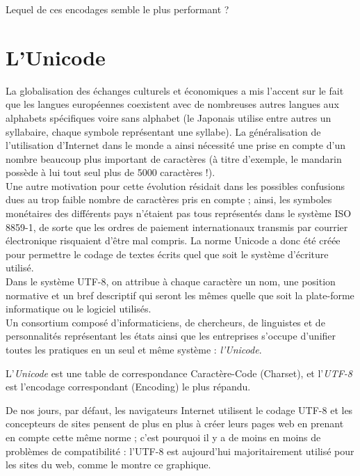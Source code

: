 \begin{exercice}[]
    Lequel de ces encodages semble le plus performant ?
\end{exercice}


\section{L'Unicode}

La globalisation des échanges culturels et économiques a mis l'accent sur le fait que les langues européennes coexistent avec de nombreuses
autres
langues aux alphabets spécifiques voire sans alphabet (le Japonais utilise entre autres un syllabaire, chaque symbole représentant une syllabe).
La
généralisation de l'utilisation d'Internet dans le monde a ainsi nécessité une prise en compte d'un
nombre beaucoup plus important de caractères (à titre d'exemple, le mandarin possède à lui tout seul plus de 5000 caractères !).\\
Une autre motivation pour cette
évolution résidait dans les possibles confusions dues au trop faible nombre de caractères pris en compte ; ainsi, les symboles monétaires des
différents
pays n'étaient pas tous représentés dans le système ISO 8859-1, de sorte que les ordres de paiement internationaux transmis par courrier
électronique
risquaient d'être mal compris. La norme Unicode a donc été créée pour permettre le codage de textes écrits quel que soit le système d'écriture
utilisé.\\

Dans le système UTF-8, on attribue à chaque caractère un nom, une position normative et un bref descriptif qui seront les mêmes quelle que soit
la plate-forme informatique
ou le logiciel utilisés.\\
Un consortium composé d'informaticiens, de chercheurs, de linguistes et de personnalités représentant les états ainsi que les entreprises
s'occupe d'unifier toutes les pratiques en un seul et même système : \textit{l'Unicode}.\\

\begin{definition}
    L'\textit{Unicode}  est  une table de correspondance Caractère-Code (Charset), et l'\textit{UTF-8} est l'encodage correspondant (Encoding) le
    plus répandu.
\end{definition}

De nos jours, par défaut, les navigateurs Internet utilisent le codage UTF-8 et les concepteurs de sites pensent de plus en plus à créer leurs
pages web
en prenant en compte cette même norme ; c'est pourquoi il y a de moins en moins de problèmes de compatibilité : l'UTF-8 est aujourd'hui
majoritairement utilisé pour les sites du web, comme le montre ce graphique.

